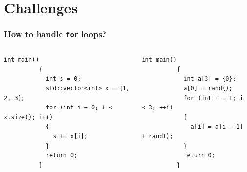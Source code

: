 \documentclass{beamer}
\begin{document}
\section{Challenges}

\begin{frame}[fragile]
  \frametitle{How to handle \texttt{for} loops?}

  \begin{columns}
    \begin{column}{0.5\textwidth}
      \begin{center}
        \begin{lstlisting}[style=cppStyle,basicstyle=\ttfamily\fontsize{7.5pt}{7.5pt}\selectfont]
          int main()
          {
            int s = 0;
            std::vector<int> x = {1, 2, 3};
            for (int i = 0; i < x.size(); i++)
            {
              s += x[i];
            }
            return 0;
          }
        \end{lstlisting}
      \end{center}
    \end{column}
    \begin{column}{0.5\textwidth}
      \begin{center}
        \begin{lstlisting}[style=cppStyle,basicstyle=\ttfamily\fontsize{6.5pt}{7.5pt}\selectfont]
          int main()
          {
            int a[3] = {0};
            a[0] = rand();
            for (int i = 1; i < 3; ++i)
            {
              a[i] = a[i - 1] + rand();
            }
            return 0;
          }
        \end{lstlisting}
      \end{center}
    \end{column}
  \end{columns}
\end{frame}
\end{document}
